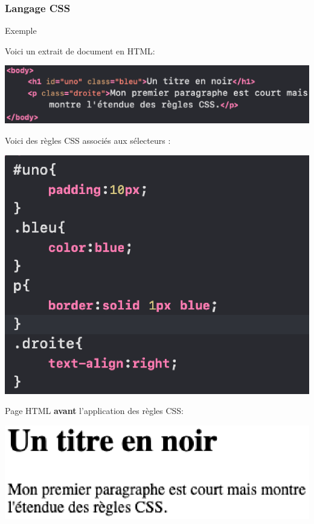 \documentclass[8pt]{beamer}
\begin{document}
\begin{frame}
\frametitle{Langage CSS}

\begin{exampleblock}{Exemple}
\begin{minipage}{0.54\textwidth}
Voici un extrait de document en HTML:
\begin{center}
\includegraphics[scale=0.38]{img/exemple2-HTML.eps}
\end{center}

Voici des règles CSS associés aux sélecteurs :

\begin{center}
\includegraphics[scale=0.38]{img/exemple2-CSS.eps}
\end{center}
\end{minipage}\hfill
\begin{minipage}{0.42\textwidth}
Page HTML \textbf{avant} l'application des règles CSS:\medskip

\includegraphics[scale=0.4]{img/exempleCSS1.eps}


\end{minipage}
\end{exampleblock}
\end{frame}
\end{document}
